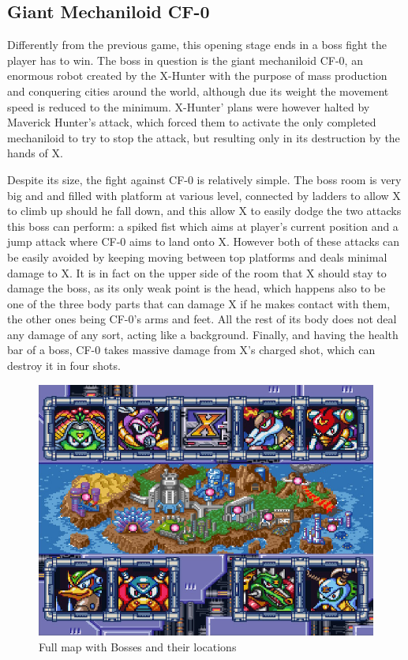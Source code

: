 \subsection{Giant Mechaniloid CF-0}
Differently from the previous game, this opening stage ends in a boss fight the player has to win. The boss in question is the giant mechaniloid CF-0, an enormous robot created by the X-Hunter with the purpose of mass production and conquering cities around the world, although due its weight the movement speed is reduced to the minimum. X-Hunter' plans were however halted by Maverick Hunter's attack, which forced them to activate the only completed mechaniloid to try to stop the attack, but resulting only in its destruction by the hands of X.

Despite its size, the fight against CF-0 is relatively simple. The boss room is very big and and filled with platform at various level, connected by ladders to allow X to climb up should he fall down, and this allow X to easily dodge the two attacks this boss can perform: a spiked fist which aims at player's current position and a jump attack where CF-0 aims to land onto X. However both of these attacks can be easily avoided by keeping moving between top platforms and deals minimal damage to X. It is in fact on the upper side of the room that X should stay to damage the boss, as its only weak point is the head, which happens also to be one of the three body parts that can damage X if he makes contact with them, the other ones being CF-0's arms and feet. All the rest of its body does not deal any damage of any sort, acting like a background. Finally, and having the health bar of a boss, CF-0 takes massive damage from X's charged shot, which can destroy it in four shots.


\begin{figure}[htp]
	\centering
	\includegraphics[width=0.5\linewidth]{figures/X2/map.png}
	\caption{Full map with Bosses and their locations}
\end{figure}


